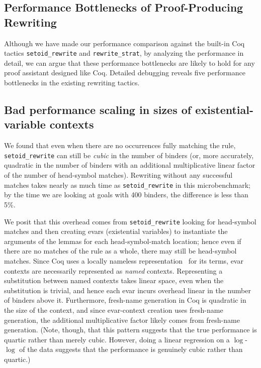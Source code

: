 \begin{subappendices}

\section{Performance Bottlenecks of Proof-Producing Rewriting} \label{sec:setoid-rewrite-bottlenecks}

Although we have made our performance comparison against the built-in Coq tactics \texttt{setoid_rewrite} and \texttt{rewrite_strat}, by analyzing the performance in detail, we can argue that these performance bottlenecks are likely to hold for any proof assistant designed like Coq.
Detailed debugging reveals five performance bottlenecks in the existing rewriting tactics.

\subsection{Bad performance scaling in sizes of existential-variable contexts}

We found that even when there are no occurrences fully matching the rule, \texttt{setoid_rewrite} can still be \emph{cubic} in the number of binders (or, more accurately, quadratic in the number of binders with an additional multiplicative linear factor of the number of head-symbol matches).
Rewriting without any successful matches takes nearly as much time as \texttt{setoid_rewrite} in this microbenchmark; by the time we are looking at goals with 400 binders, the difference is less than 5\%.

We posit that this overhead comes from \texttt{setoid_rewrite} looking for head-symbol matches and then creating evars (existential variables) to instantiate the arguments of the lemmas for each head-symbol-match location; hence even if there are no matches of the rule as a whole, there may still be head-symbol matches.
Since Coq uses a locally nameless representation~\cite{Engineering2008Aydemir} for its terms, evar contexts are necessarily represented as \emph{named} contexts.
Representing a substitution between named contexts takes linear space, even when the substitution is trivial, and hence each evar incurs overhead linear in the number of binders above it.
Furthermore, fresh-name generation in Coq is quadratic in the size of the context, and since evar-context creation uses fresh-name generation, the additional multiplicative factor likely comes from fresh-name generation.
(Note, though, that this pattern suggests that the true performance is quartic rather than merely cubic.  However, doing a linear regression on a $\log$-$\log$ of the data suggests that the performance is genuinely cubic rather than quartic.)


\end{subappendices}
